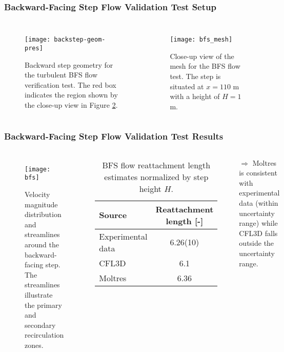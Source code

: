 \begin{frame}
  \frametitle{Backward-Facing Step Flow Validation Test Setup}
  \begin{columns}
    \column{5.5cm}
    \begin{figure}[h]
      \centering
      \texttt{[image: backstep-geom-pres]}
      \caption{Backward step geometry for the turbulent BFS flow verification test. The red box indicates
      the region shown by the close-up view in Figure \ref{fig:bfs-mesh}.}
      \label{fig:backstep-geom}
    \end{figure}
    \column{5.5cm}
    \begin{figure}[h]
      \centering
      \texttt{[image: bfs\_mesh]}
      \caption{Close-up view of the mesh for the BFS flow test. The step is situated at $x=110$ m
      with a height of $H=1$ m.}
      \label{fig:bfs-mesh}
    \end{figure}
  \end{columns}
\end{frame}

\begin{frame}
  \frametitle{Backward-Facing Step Flow Validation Test Results}
  \begin{columns}
    \column{5.5cm}
    \begin{figure}[htb!]
      \centering
      \texttt{[image: bfs]}
      \caption{Velocity magnitude distribution and streamlines around the backward-facing step. The
      streamlines illustrate the primary and secondary recirculation zones.}
      \label{fig:bfs}
    \end{figure}
    \column{5.5cm}
    \begin{table}[htb]
      \centering
      \scriptsize
      \caption{BFS flow reattachment length estimates normalized by step height $H$.}
      \begin{tabular}{l S[table-format=1.2(2)]}
        \toprule
        Source & {Reattachment length [-]} \\
        \midrule
        Experimental data & 6.26(10) \\
        CFL3D & 6.1 \\
        Moltres & 6.36 \\
        \bottomrule
      \end{tabular}
      \label{table:bfs-reattach}
    \end{table}
    \vspace{.1cm}

    $\Rightarrow$ Moltres is consistent with experimental data (within uncertainty range) while CFL3D
    falls outside the uncertainty range.
  \end{columns}
\end{frame}

